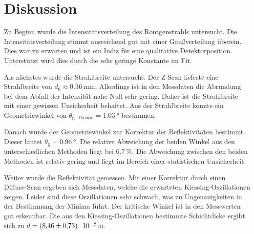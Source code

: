 \chapter{Diskussion}
\label{cha:Diskussion}
Zu Beginn wurde die Intensitätsverteilung des Röntgenstrahls untersucht. Die Intensitätsverteilung stimmt ausreichend gut mit einer Gaußverteilung überein. Dies war zu erwarten und 
ist ein Indiz für eine qualitative Detektorposition. Unterstützt wird dies durch die sehr geringe Konstante im Fit. 

Als nächstes wurde die Strahlbreite untersucht. Der Z-Scan lieferte eine Strahlbreite von $d_0 \approx \qty{0.36}{\milli\metre}$. Allerdings ist in den Messdaten die Abrundung bei 
dem Abfall der Intensität nahe Null sehr gering. Daher ist die Strahlbreite mit einer gewissen Unsicherheit behaftet. Aus der Strahlbreite konnte ein Geometriewinkel von 
$\theta_\text{g, Theorie} = \qty{1.03}{\degree}$ bestimmen.

Danach wurde der Geometriewinkel zur Korrektur der Reflektivitäten bestimmt. Dieser lautet $\theta_\text{g} = \qty{0.96}{\degree}$. Die relative Abweichung der beiden Winkel 
aus den unterschiedlichen Methoden liegt bei $\qty{6.7}{\percent}$. Die Abweichung zwischen den beiden Methoden ist relativ gering und liegt im Bereich einer statistischen Unsicherheit.

Weiter wurde die Reflektivität gemessen. Mit einer Korrektur durch einen Diffuse-Scan ergeben sich Messdaten, welche die erwarteten Kiessing-Oszillationen zeigen. Leider sind diese 
Oszillationen sehr schwach, was zu Ungenauigkeiten in der Bestimmung der Minima führt. Der kritische Winkel ist in den Messwerten gut erkennbar. Die aus den 
Kiessing-Oszillationen bestimmte Schichtdicke ergibt sich zu $d = \qty{8.46 +- 0.73e-8}{\metre}$.

